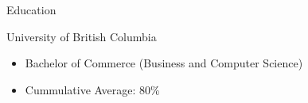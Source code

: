 \documentclass{article}
\newlength{\tabin}
\newlength{\secsep}
\newcommand{\lineunder}{\vspace*{-8pt} \\ \hspace*{-6pt} \hrulefill \\ \vspace*{-15pt}}
\newenvironment{tabbedsection}[1]{
  \begin{list}{}{
      \setlength{\itemsep}{0pt}
      \setlength{\labelsep}{0pt}
      \setlength{\labelwidth}{0pt}
      \setlength{\leftmargin}{\tabin}
      \setlength{\rightmargin}{\tabin}
      \setlength{\listparindent}{0pt}
      \setlength{\parsep}{0pt}
      \setlength{\parskip}{0pt}
      \setlength{\partopsep}{0pt}
      \setlength{\topsep}{#1}
    }
  \item[]
}{\end{list}}
\newenvironment{resume_section}[1]{
  \filbreak
  \vspace{2\secsep}
  \textsc{\large#1}
  \lineunder
  \begin{tabbedsection}{\secsep}
}{\end{tabbedsection}}
\newenvironment{resume_subsection}[2][]{
  \textbf{#2} \hfill {\footnotesize #1} \hspace{2em}
  \begin{tabbedsection}{0.5\secsep}
}{\end{tabbedsection}}
\newenvironment{subitems}{
  \renewcommand{\labelitemi}{-}
  \begin{itemize}
      \setlength{\labelsep}{1em}
}{\end{itemize}}
\begin{document}
\begin{resume_section}{Education}
  \begin{resume_subsection}{University of British Columbia}
    \begin{subitems}
      \item Bachelor of Commerce (Business and Computer Science)
      \item Cummulative Average: 80\%
    \end{subitems}
  \end{resume_subsection}


\end{resume_section}
\end{document}
